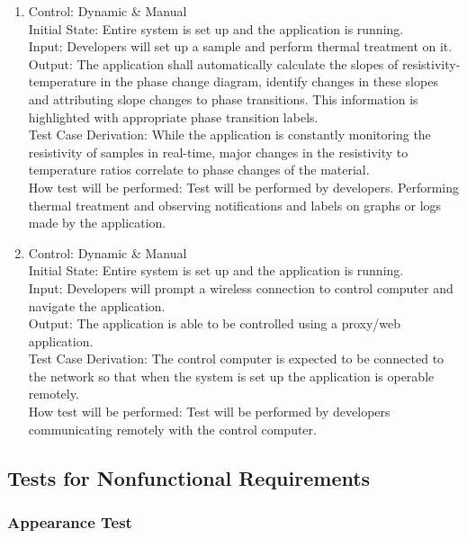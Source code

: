 \documentclass[12pt, titlepage]{article}
\begin{document}
\begin{enumerate}[{FR-T}1.]
    \item Control: Dynamic \& Manual\\
    Initial State: Entire system is set up and the application is running.\\
    Input: Developers will set up a sample and perform thermal treatment on it.\\
    Output: The application shall automatically calculate the slopes of resistivity-temperature in the phase change diagram, identify changes in these slopes and attributing slope changes to phase transitions. This information is highlighted with appropriate phase transition labels.\\
    Test Case Derivation: While the application is constantly monitoring the resistivity of samples in real-time, major changes in the resistivity to temperature ratios correlate to phase changes of the material.\\
    How test will be performed: Test will be performed by developers. Performing thermal treatment and observing notifications and labels on graphs or logs made by the application.
    
    \item Control: Dynamic \& Manual\\
    Initial State: Entire system is set up and the application is running.\\
    Input: Developers will prompt a wireless connection to control computer and navigate the application.\\
    Output: The application is able to be controlled using a proxy/web application.\\
    Test Case Derivation: The control computer is expected to be connected to the network so that when the system is set up the application is operable remotely.\\
    How test will be performed: Test will be performed by developers communicating remotely with the control computer.  
\end{enumerate}

\subsection{Tests for Nonfunctional Requirements}

\subsubsection{Appearance Test}
\end{document}

